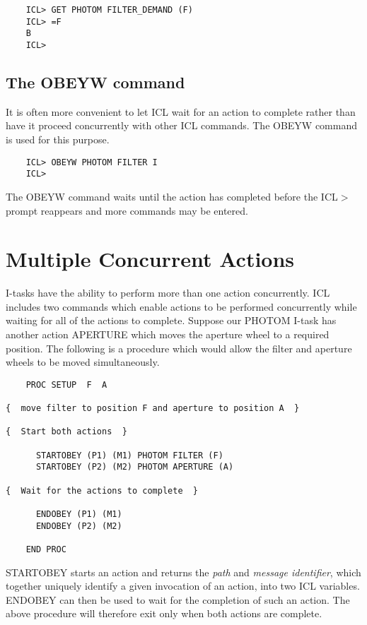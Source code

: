 \begin{verbatim}
    ICL> GET PHOTOM FILTER_DEMAND (F)
    ICL> =F
    B
    ICL>
\end{verbatim}

\subsection{The OBEYW command}

It is often more convenient to let ICL wait for an action to complete rather than
have it proceed concurrently with other ICL commands. The OBEYW command
is used for this purpose.

\begin{verbatim}
    ICL> OBEYW PHOTOM FILTER I
    ICL>
\end{verbatim}

The OBEYW command waits until the action has completed before the ICL$>$
prompt reappears and more commands may be entered.

\section{Multiple Concurrent Actions}
                    
I-tasks have the ability to perform more than one action concurrently.
ICL includes two commands which enable actions to be performed concurrently
while waiting for all of the actions to complete. Suppose our PHOTOM
I-task has another action APERTURE which moves the aperture wheel to
a required position. The following is a procedure which would allow the
filter and aperture wheels to be moved simultaneously.

\begin{verbatim}
    PROC SETUP  F  A

{  move filter to position F and aperture to position A  }
      
{  Start both actions  }

      STARTOBEY (P1) (M1) PHOTOM FILTER (F)
      STARTOBEY (P2) (M2) PHOTOM APERTURE (A)
      
{  Wait for the actions to complete  }
                                        
      ENDOBEY (P1) (M1)
      ENDOBEY (P2) (M2)

    END PROC
\end{verbatim}          

STARTOBEY starts an action and returns the {\em path} and {\em message
identifier}, which together uniquely identify a given invocation of an action,
into two ICL variables. ENDOBEY can then be used to wait for the completion
of such an action. The above procedure will therefore exit only when both
actions are complete.

